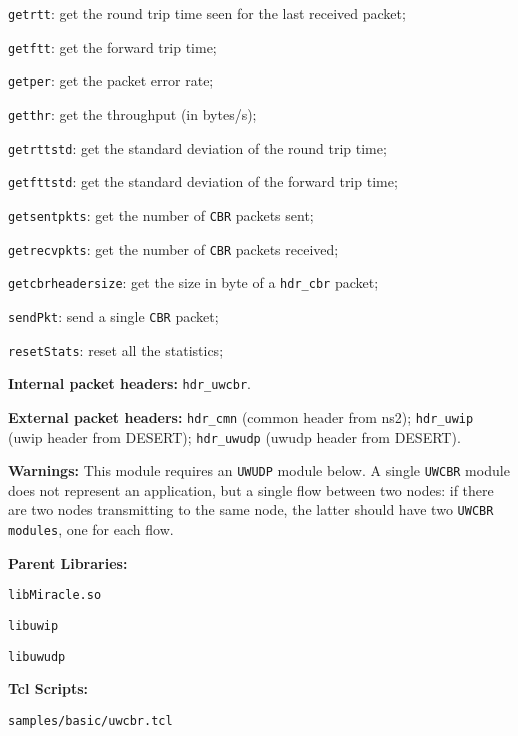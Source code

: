 \begin{description}
\begin{description}
    \item {\tt getrtt}: get the round trip time seen for the last received packet;
    \item {\tt getftt}: get the forward trip time;
    \item {\tt getper}: get the packet error rate;
    \item {\tt getthr}: get the throughput (in bytes/s);
    \item {\tt getrttstd}: get the standard deviation of the round trip time;
    \item {\tt getfttstd}: get the standard deviation of the forward trip time;
    \item {\tt getsentpkts}: get the number of {\tt CBR} packets sent;
    \item {\tt getrecvpkts}: get the number of {\tt CBR} packets received;
    \item {\tt getcbrheadersize}: get the size in byte of a {\tt hdr\_cbr} packet;
    \item {\tt sendPkt}: send a single {\tt CBR} packet;
    \item {\tt resetStats}: reset all the statistics;
   \end{description}
   \item {\bf Internal packet headers:} {\tt hdr\_uwcbr}.
   \item {\bf External packet headers:} {\tt hdr\_cmn} (common header from ns2); {\tt hdr\_uwip} (uwip header from DESERT);  {\tt hdr\_uwudp} (uwudp header from DESERT).
   \item {\bf Warnings:} This module requires an {\tt UWUDP} module below. A single {\tt UWCBR} module does not represent an application, but a single flow between two nodes: if there are two nodes transmitting to the same node, the latter should have two {\tt UWCBR modules}, one for each flow.
   \item {\bf Parent Libraries:}
   \begin{description}
   \item {\tt libMiracle.so}
   \item {\tt libuwip}
   \item {\tt libuwudp}
   \end{description}
   \item {\bf Tcl Scripts:} 
   \begin{description}
   \item {\tt samples/basic/uwcbr.tcl}
   \end{description}
\end{description}

